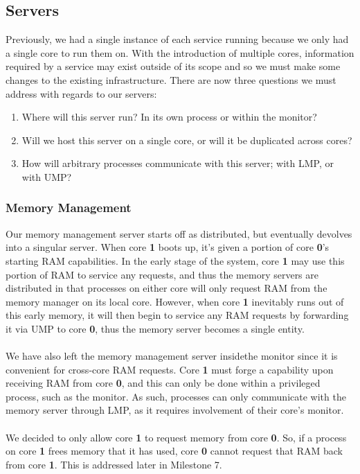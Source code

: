 \subsection{Servers}
Previously, we had a single instance of each service running because we only had a single core to run them on. With the introduction of multiple cores, information required by a service may exist outside of its scope and so we must make some changes to the existing infrastructure. There are now three questions we must address with regards to our servers:
\begin{enumerate}
    \item Where will this server run? In its own process or within the monitor?
    \item Will we host this server on a single core, or will it be duplicated across cores?
    \item How will arbitrary processes communicate with this server; with LMP, or with UMP?
\end{enumerate}

\subsubsection{Memory Management}
Our memory management server starts off as distributed, but eventually devolves into a singular server. When core \textbf{1} boots up, it's given a portion of core \textbf{0}'s starting RAM capabilities. In the early stage of the system, core \textbf{1} may use this portion of RAM to service any requests, and thus the memory servers are distributed in that processes on either core will only request RAM from the memory manager on its local core. However, when core \textbf{1} inevitably runs out of this early memory, it will then begin to service any RAM requests by forwarding it via UMP to core \textbf{0}, thus the memory server becomes a single entity.
\\\\
We have also left the memory management server insidethe monitor since it is convenient for cross-core RAM requests. Core \textbf{1} must forge a capability upon receiving RAM from core \textbf{0}, and this can only be done within a privileged process, such as the monitor. As such, processes can only communicate with the memory server through LMP, as it requires involvement of their core's monitor. 
\\\\
We decided to only allow core \textbf{1} to request memory from core \textbf{0}. So, if a process on core \textbf{1} frees memory that it has used, core \textbf{0} cannot request that RAM back from core \textbf{1}. This is addressed later in Milestone 7.

